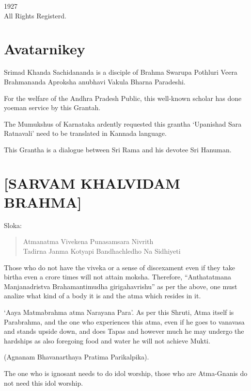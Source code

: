 \begin{center}
1927\\ All Rights Registerd.
\end{center}

\chapter*{Avatarnikey}

Srimad Khanda Sachidananda is a disciple of Brahma Swarupa Pothluri Veera Brahmananda Aproksha anubhavi Vakula Bharna Paradeshi.

For the welfare of the Andhra Pradesh Public, this well-known scholar has done yoeman service by this Grantah.

The Mumukshus of Karnataka ardently requested this grantha ‘Upanishad Sara Ratnavali’ need to be translated in Kannada language.

This Grantha is a dialogue between Sri Rama and his devotee Sri Hanuman.

\chapter*{[SARVAM KHALVIDAM BRAHMA]}

Sloka:

\begin{verse}
 Atmanatma Vivekena Punasamsara Nivrith \\
 Tadirna Janma Kotyapi Bandhachledho Na Sidhiyeti 
\end{verse}

Those who do not have the viveka or a sense of discexament even if they take birtha even a crore times will not attain moksha. Therefore, “Anthatatmana Manjanadristva  Brahamantimudha girigahavrishu” as per the above, one must analize what kind of a body it is and the atma which resides in it.

‘Aaya Matmabrahma  atma Narayana Para’. As per this Shruti, Atma itself is Parabrahma, and the one who experiences this atma, even if he goes to vanavasa and stands upside down, and does Tapas and however much he may undergo the hardships as also foregoing food and water he will not achieve Mukti.

\begin{center}
(Agnanam Bhavanarthaya Pratima Parikalpika).
\end{center}

The one who is ignosant needs to do idol worship, those who are Atma-Gnanis do not need this idol worship.


